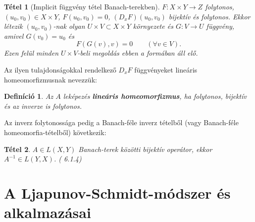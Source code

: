 \documentclass[oneside, titlepage, 12pt, a4paper]{report}
\newtheorem{theorem}{Tétel}[section]
\newtheorem{definition}{Definíció}[section]
\begin{document}
\begin{theorem}[Implicit függvény tétel Banach-terekben]
\label{implicit}
$F : X \times Y \rightarrow Z$ folytonos, $(u_0, v_0) \in X \times Y$, $F(u_0, v_0) = 0$, $(D_xF)(u_0, v_0)$ bijektív és folytonos. Ekkor létezik $(u_0, v_0)$-nak olyan $U \times V \subset X \times Y$ környezete és $G:V \rightarrow U$ függvény, amivel $G(v_0) = u_0$ és
\begin{equation*}
F(G(v), v) = 0 \qquad (\forall v \in V).
\end{equation*}
Ezen felül minden $U \times V$-beli megoldás ebben a formában áll elő. \cite{IFaLS}
\end{theorem}
Az ilyen tulajdonságokkal rendelkező $D_xF$ függvényeket lineáris homeomorfizmusnak nevezzük:
\begin{definition}
Az $A$ leképezés \textbf{lineáris homeomorfizmus}, ha folytonos, bijektív és az inverze is folytonos.
\end{definition}
Az inverz folytonossága pedig a Banach-féle inverz tételből (vagy Banach-féle homeomorfia-tételből) következik:
\begin{theorem}
$A \in L(X, Y)$ Banach-terek közötti bijektív operátor, ekkor $A^{-1} \in L(Y, X)$. (\cite{funkanal} 6.1.4) %
\end{theorem}


\onehalfspacing
\chapter{A Ljapunov-Schmidt-módszer és alkalmazásai}
\label{chap:LjapunovSchmidt}
\end{document}
